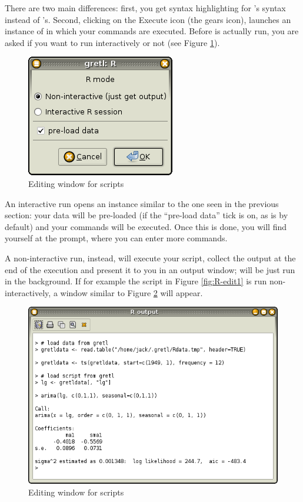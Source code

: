 There are two main differences: first, you get syntax highlighting for
's syntax instead of 's. Second, clicking on the
Execute icon (the gears icon), launches an instance of  in
which your commands are executed.  Before  is actually run, you
are asked if you want to run  interactively or not (see Figure
\ref{fig:R-exec-mode}).

\begin{figure}[htbp]
  \centering
  \includegraphics[scale=0.7]{figures/R-exec-mode}
  \caption{Editing window for  scripts}
  \label{fig:R-exec-mode}
\end{figure}

An interactive run opens an  instance similar to the one seen
in the previous section: your data will be pre-loaded (if the
``pre-load data'' tick is on, as is by default) and your commands will
be executed. Once this is done, you will find yourself at the 
prompt, where you can enter more commands.

A non-interactive run, instead, will execute your script, collect the
output at the end of the execution and present it to you in an output
window;  will be just run in the background. If for example the
script in Figure \ref{fig:R-edit1} is run non-interactively, a window
similar to Figure \ref{fig:R-output1} will appear.

\begin{figure}[htbp]
  \centering
  \includegraphics[scale=0.7]{figures/R-output1}
  \caption{Editing window for  scripts}
  \label{fig:R-output1}
\end{figure}

